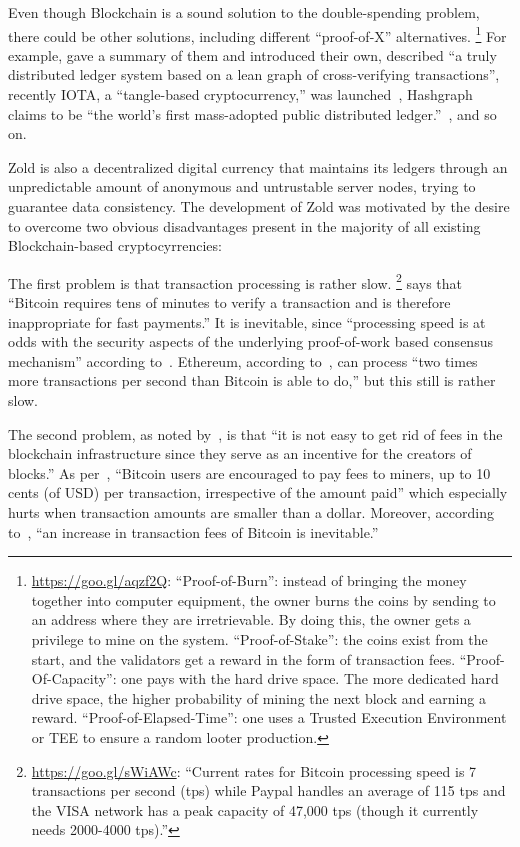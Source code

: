 \documentclass[11pt,oneside]{article}
\begin{document}
Even though Blockchain is a sound solution to the double-spending
problem, there could be other solutions,
including different ``proof-of-X'' alternatives.%
\footnote{%
  \url{https://goo.gl/aqzf2Q}:
  ``Proof-of-Burn'': instead of bringing the money together into computer equipment,
  the owner burns the coins by sending to an address where they are
  irretrievable. By doing this, the owner gets a privilege to
  mine on the system.
  ``Proof-of-Stake'': the coins exist from the start, and
  the validators get a reward in the form of transaction fees.
  ``Proof-Of-Capacity'': one pays with the hard drive space. The more
  dedicated hard drive space, the higher probability of mining
  the next block and earning a reward.
  ``Proof-of-Elapsed-Time'': one uses a Trusted Execution Environment or TEE
  to ensure a random looter production.
}
For example, \textcite{everaere2010} gave
a summary of them and introduced their own,
\textcite{boyen2016} described
``a truly distributed ledger system based on a lean graph of cross-verifying transactions'',
recently IOTA, a ``tangle-based cryptocurrency,'' was launched~\parencite{popov2017},
Hashgraph claims
to be ``the world's first mass-adopted public distributed ledger.''~\parencite{hashgraph},
and so on.

Zold is also a decentralized digital currency that maintains its ledgers
through an unpredictable amount of anonymous and untrustable server nodes, trying to guarantee
data consistency.
The development of Zold was motivated by the desire to overcome
two obvious disadvantages present in the majority of all existing
Blockchain-based cryptocyrrencies:

The first problem is that transaction processing is rather slow.%
\footnote{%
  \url{https://goo.gl/sWiAWc}:
  ``Current rates for Bitcoin processing
  speed is 7 transactions per second (tps) while Paypal handles
  an average of 115 tps and the VISA
  network has a peak capacity of 47,000 tps (though it currently needs 2000-4000 tps).''
}
\textcite{karame2012} says that ``Bitcoin requires tens of minutes to verify a transaction
and is therefore inappropriate for fast payments.''
It is inevitable, since
``processing speed is at odds with the security aspects of the underlying
proof-of-work based consensus mechanism'' according to~\textcite{kiayias2015}.
Ethereum, according to~\textcite{fekkes2018}, can process
``two times more transactions per second than Bitcoin is able to do,''
but this still is rather slow.

The second problem, as noted by~\textcite{popov2017}, is that ``it is not easy to get rid
of fees in the blockchain infrastructure since they serve
as an incentive for the creators of blocks.''
As per~\textcite{moser2015}, ``Bitcoin users are encouraged to
pay fees to miners, up to 10 cents (of USD) per transaction, irrespective of the
amount paid'' which especially hurts when transaction amounts are smaller than a dollar.
Moreover, according to~\textcite{kaskaloglu2014},
``an increase in transaction fees of Bitcoin is inevitable.''
\end{document}
